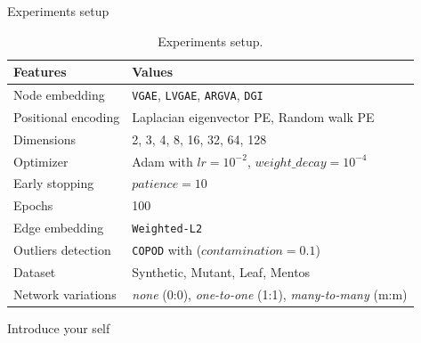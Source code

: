 \documentclass[aspectratio=169]{beamer}
\begin{document}
    \begin{frame}{Experiments setup}

        \begin{table}[htp!]
            \scriptsize
            \centering
            \caption{Experiments setup.}
            \begin{tabular}{@{}ll@{}}\toprule
                Features & Values \\\midrule
                Node embedding & 
                \texttt{VGAE}, \texttt{LVGAE}, \texttt{ARGVA}, \texttt{DGI} \\
                Positional encoding & Laplacian eigenvector PE, Random walk PE \\ %
                Dimensions & 2, 3, 4, 8, 16, 32, 64, 128 \\ %
                Optimizer & Adam with $lr=10^{-2}$, $weight\_decay=10^{-4}$ \\
                Early stopping & $patience=10$ \\
                Epochs & 100 \\\midrule
                Edge embedding & \texttt{Weighted-L2} \\\midrule
                Outliers detection & \texttt{COPOD} with ($contamination=0.1$) \\\midrule
                Dataset & Synthetic, Mutant, Leaf, Mentos \\
                Network variations & \textit{none} (0:0), \textit{one-to-one} (1:1), \textit{many-to-many} (m:m) \\\bottomrule
            \end{tabular}
        \end{table}

        \begin{note}
            {Introduce your self}
        \end{note}
    \end{frame}
\end{document}
